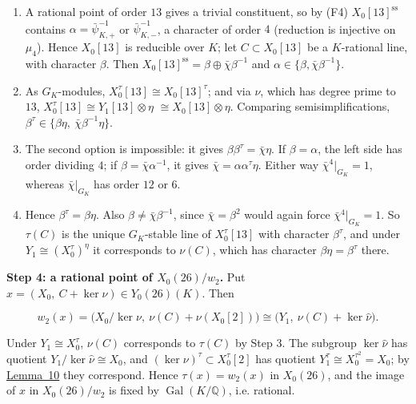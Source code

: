 \documentclass[11pt]{article}
\newcommand{\Q}{\mathbb Q}
\DeclareMathOperator{\Gal}{Gal}
\begin{document}
\begin{enumerate}
\item A rational point of order \(13\) gives a trivial constituent, so by (F4) \(X_0[13]^{\mathrm{ss}}\) contains
          \(\alpha=\bar\psi_{K,+}^{-1}\) or \(\bar\psi_{K,-}^{-1}\), a character of order \(4\) (reduction is
          injective on \(\mu_4\)). Hence \(X_0[13]\) is reducible over \(K\); let \(C\subset X_0[13]\) be a
          \(K\)-rational line, with character \(\beta\). Then \(X_0[13]^{\mathrm{ss}}=\beta\oplus\bar\chi\beta^{-1}\)
          and \(\alpha\in\{\beta,\bar\chi\beta^{-1}\}\).
\item As \(G_K\)-modules, \(X_0^\tau[13]\cong X_0[13]^\tau\); and via \(\nu\), which has degree prime to \(13\),
          \(X_0^\tau[13]\cong Y_1[13]\otimes\eta\) \({}\cong X_0[13]\otimes\eta\). Comparing semisimplifications,
          \(\beta^\tau\in\{\beta\eta,\ \bar\chi\beta^{-1}\eta\}\).
\item The second option is impossible: it gives \(\beta\beta^\tau=\bar\chi\eta\). If \(\beta=\alpha\), the left
          side has order dividing \(4\); if \(\beta=\bar\chi\alpha^{-1}\), it gives \(\bar\chi=\alpha\alpha^\tau\eta\).
          Either way \(\bar\chi^4|_{G_K}=1\), whereas \(\bar\chi|_{G_K}\) has order \(12\) or \(6\).
\item Hence \(\beta^\tau=\beta\eta\). Also \(\beta\neq\bar\chi\beta^{-1}\), since \(\bar\chi=\beta^2\) would
          again force \(\bar\chi^4|_{G_K}=1\). So \(\tau(C)\) is the unique \(G_K\)-stable line of \(X_0^\tau[13]\)
          with character \(\beta^\tau\), and under \(Y_1\cong(X_0^\tau)^\eta\) it corresponds to \(\nu(C)\), which
          has character \(\beta\eta=\beta^\tau\) there.
\end{enumerate}

\textbf{Step 4: a rational point of \(X_0(26)/w_2\).} Put \(x=(X_0,\ C+\ker\nu)\in Y_0(26)(K)\). Then

\[
w_2(x)=\bigl(X_0/\ker\nu,\ \nu(C)+\nu(X_0[2])\bigr)\cong\bigl(Y_1,\ \nu(C)+\ker\hat\nu\bigr).
\]

Under \(Y_1\cong X_0^\tau\), \(\nu(C)\) corresponds to \(\tau(C)\) by Step 3. The subgroup \(\ker\hat\nu\)
      has quotient \(Y_1/\ker\hat\nu\cong X_0\), and \((\ker\nu)^\tau\subset X_0^\tau[2]\) has quotient
      \(Y_1^\tau\cong X_0^{\tau^2}=X_0\); by \hyperref[lemma-two-subgroup]{Lemma~10} they correspond. Hence
      \(\tau(x)=w_2(x)\) in \(X_0(26)\), and the image of \(x\) in \(X_0(26)/w_2\) is fixed by \(\Gal(K/\Q)\),
      i.e. rational.
\end{document}
